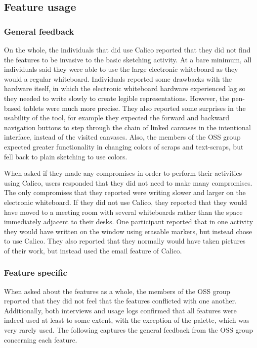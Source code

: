 \subsection{Feature usage}
\label{chapter:evaluation:deployment1:part1}

\subsubsection{General feedback}

On the whole, the individuals that did use Calico reported that they did not find the features to be invasive to the basic sketching activity. At a bare minimum, all individuals said they were able to use the large electronic whiteboard as they would a regular whiteboard. Individuals reported some drawbacks with the hardware itself, in which the electronic whiteboard hardware experienced lag so they needed to write slowly to create legible representations. However, the pen-based tablets were much more precise. They also reported some surprises in the usability of the tool, for example they expected the forward and backward navigation buttons to step through the chain of linked canvases in the intentional interface, instead of the visited canvases. Also, the members of the OSS group expected greater functionality in changing colors of scraps and text-scraps, but fell back to plain sketching to use colors.

When asked if they made any compromises in order to perform their activities using Calico, users responded that they did not need to make many compromises. The only compromises that they reported were writing slower and larger on the electronic whiteboard. If they did not use Calico, they reported that they would have moved to a meeting room with several whiteboards rather than the space immediately adjacent to their desks. One participant reported that in one activity they would have written on the window using erasable markers, but instead chose to use Calico. They also reported that they normally would have taken pictures of their work, but instead used the email feature of Calico.

\subsubsection{Feature specific}

When asked about the features as a whole, the members of the OSS group reported that they did not feel that the features conflicted with one another. Additionally, both interviews and usage logs confirmed that all features were indeed used at least to some extent, with the exception of the palette, which was very rarely used. The following captures the general feedback from the OSS group concerning each feature.

